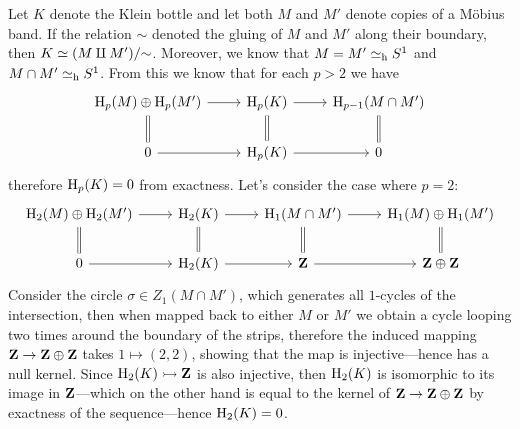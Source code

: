 \begin{example}
\label{exp:klein-bottle-homology}
Let \(K\) denote the Klein bottle and let both \(M\) and \(M'\) denote copies of
a M\"{o}bius band. If the relation \(\sim\) denoted the gluing of \(M\) and
\(M'\) along their boundary, then \(K \simeq (M \amalg M')/{\sim}\). Moreover, we know
that \(M = M' \simeq_{\text{h}} S^1\) and \(M \cap M' \simeq_{\text{h}} S^1\). From this we know that for
each \(p > 2\) we have
\[
\begin{tikzcd}
\Hmlg_p(M) \oplus \Hmlg_p(M') \ar[r] \ar[d, equals]
&\Hmlg_p(K) \ar[r] \ar[d, equals]
&\Hmlg_{p-1}(M \cap M') \ar[d, equals]
\\
0 \ar[r]
&\Hmlg_p(K) \ar[r]
&0
\end{tikzcd}
\]
therefore \(\operatorname{H}_p(K) = 0\) from exactness. Let's consider the case where
\(p = 2\):
\[
\begin{tikzcd}
\Hmlg_2(M) \oplus \Hmlg_2(M') \ar[r] \ar[d, equals]
&\Hmlg_2(K)
\ar[r] \ar[d, equals]
&\Hmlg_1(M \cap M')
\ar[r] \ar[d, equals]
&\Hmlg_1(M) \oplus \Hmlg_1(M') \ar[d, equals]
\\
0 \ar[r]
&\Hmlg_2(K)
\ar[r]
&\Z
\ar[r]
&\Z \oplus \Z
\end{tikzcd}
\]
Consider the circle \(\sigma \in Z_1(M \cap M')\), which generates all
\(1\)-cycles of the intersection, then when mapped back to either \(M\) or
\(M'\) we obtain a cycle looping two times around the boundary of the strips,
therefore the induced mapping \(\mathbf{Z} \to \mathbf{Z} \oplus \mathbf{Z}\) takes
\(1 \mapsto (2, 2)\), showing that the map is injective---hence has a null kernel. Since
\(\operatorname{H}_2(K) \rightarrowtail \mathbf{Z}\) is also injective, then \(\operatorname{H}_2(K)\) is isomorphic to
its image in \(\mathbf{Z}\)---which on the other hand is equal to the kernel of
\(\mathbf{Z} \to \mathbf{Z} \oplus \mathbf{Z}\) by exactness of the sequence---hence \(\operatorname{H}_2(K) = 0\).


\end{example}
